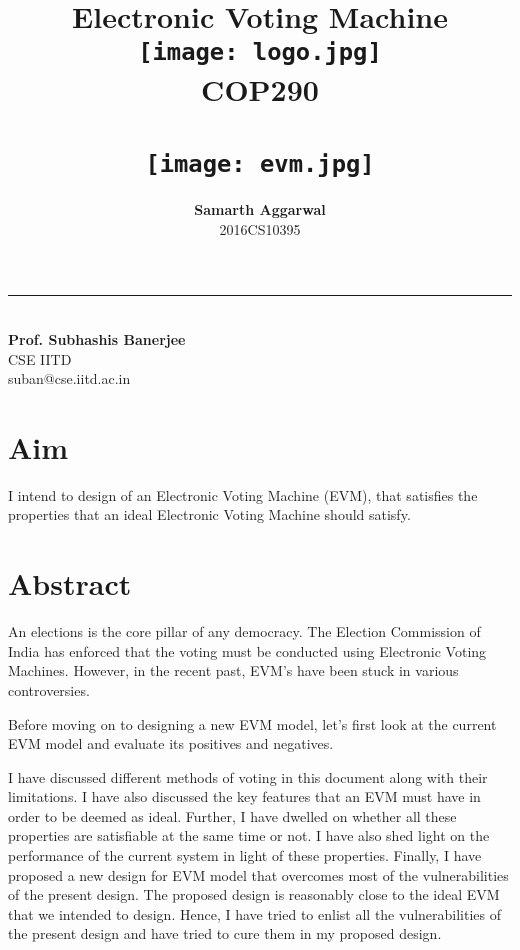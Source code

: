 \documentclass[11pt]{article}
\title{ \textbf{Electronic Voting Machine}
	  \\ \texttt{[image: logo.jpg]}
	  \\    \textbf{COP290}
	  \\ {\large \textbf{ }}
	  \\ \texttt{[image: evm.jpg]}}
\author{
	\textbf{Samarth Aggarwal}\\ 
	2016CS10395\\
}
\date{}
\begin{document}
	\maketitle


\begin{flushright}
\noindent\rule{3.2cm}{0.4pt} 
\\ \textbf{Prof. Subhashis Banerjee}
\\ CSE IITD
\\ suban@cse.iitd.ac.in
\end{flushright}


	\newpage

    
    \section{Aim}
    I intend to design of an Electronic Voting Machine (EVM), that satisfies the properties that an ideal Electronic Voting Machine should satisfy.
    
	\section{Abstract}

    An elections is the core pillar of any democracy. The Election Commission of India has enforced that the voting must be conducted using Electronic Voting Machines. However, in the recent past, EVM's have been stuck in various controversies.

    \newline
    
    \newline
    
    Before moving on to designing a new EVM model, let's first look at the current EVM model and evaluate its positives and negatives.
    
    
    \newline
    
    I have discussed different methods of voting in this document along with their limitations. I have also discussed the key features that an EVM must have in order to be deemed as ideal. Further, I have dwelled on whether all these properties are satisfiable at the same time or not. I have also shed light on the performance of the current system in light of these properties. Finally, I have proposed a new design for EVM model that overcomes most of the vulnerabilities of the present design. The proposed design is reasonably close to the ideal EVM that we intended to design. Hence, I have tried to enlist all the vulnerabilities of the present design and have tried to cure them in my proposed design.
    
\end{document}
